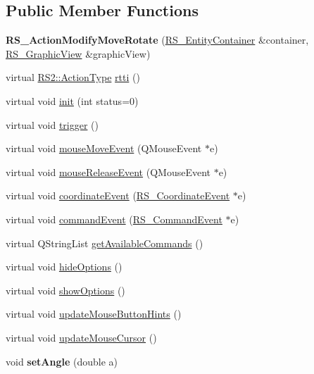 \subsection*{Public Member Functions}
\begin{DoxyCompactItemize}
\item 
\hypertarget{classRS__ActionModifyMoveRotate_ab85b78364aad48afdf6547156252dac9}{{\bfseries R\-S\-\_\-\-Action\-Modify\-Move\-Rotate} (\hyperlink{classRS__EntityContainer}{R\-S\-\_\-\-Entity\-Container} \&container, \hyperlink{classRS__GraphicView}{R\-S\-\_\-\-Graphic\-View} \&graphic\-View)}\label{classRS__ActionModifyMoveRotate_ab85b78364aad48afdf6547156252dac9}

\item 
virtual \hyperlink{classRS2_afe3523e0bc41fd637b892321cfc4b9d7}{R\-S2\-::\-Action\-Type} \hyperlink{classRS__ActionModifyMoveRotate_ae441ccf409f894b8a667e889f537bdcd}{rtti} ()
\item 
virtual void \hyperlink{classRS__ActionModifyMoveRotate_ad0b11d66b6ede4a83f810be95c4ea20e}{init} (int status=0)
\item 
virtual void \hyperlink{classRS__ActionModifyMoveRotate_ab407e961ac1242c95a2a042233bda39f}{trigger} ()
\item 
virtual void \hyperlink{classRS__ActionModifyMoveRotate_a3a38b313f2aff3f972fca068eb751575}{mouse\-Move\-Event} (Q\-Mouse\-Event $\ast$e)
\item 
virtual void \hyperlink{classRS__ActionModifyMoveRotate_ae752e65749598032f2f6693dcf113528}{mouse\-Release\-Event} (Q\-Mouse\-Event $\ast$e)
\item 
virtual void \hyperlink{classRS__ActionModifyMoveRotate_a8defc8d7ceb7a7b5b88dadf7a6104535}{coordinate\-Event} (\hyperlink{classRS__CoordinateEvent}{R\-S\-\_\-\-Coordinate\-Event} $\ast$e)
\item 
virtual void \hyperlink{classRS__ActionModifyMoveRotate_a4e9465c7281c632e4022472ade135ab8}{command\-Event} (\hyperlink{classRS__CommandEvent}{R\-S\-\_\-\-Command\-Event} $\ast$e)
\item 
virtual Q\-String\-List \hyperlink{classRS__ActionModifyMoveRotate_a8449d9b50d93aaad5f2585a307968bbf}{get\-Available\-Commands} ()
\item 
virtual void \hyperlink{classRS__ActionModifyMoveRotate_a0e7c92ddce8a260d65b8e048189683dc}{hide\-Options} ()
\item 
virtual void \hyperlink{classRS__ActionModifyMoveRotate_abfc0797b916914a83c18897eb13816a9}{show\-Options} ()
\item 
virtual void \hyperlink{classRS__ActionModifyMoveRotate_afcbb58f41f0e20bdeddad7f3c00c599e}{update\-Mouse\-Button\-Hints} ()
\item 
virtual void \hyperlink{classRS__ActionModifyMoveRotate_aa92086117c360f941871e711a8c31f70}{update\-Mouse\-Cursor} ()
\item 
\hypertarget{classRS__ActionModifyMoveRotate_a509c94ffb79d94c0b90fddb515ffea0b}{void {\bfseries set\-Angle} (double a)}\label{classRS__ActionModifyMoveRotate_a509c94ffb79d94c0b90fddb515ffea0b}


\end{DoxyCompactItemize}
